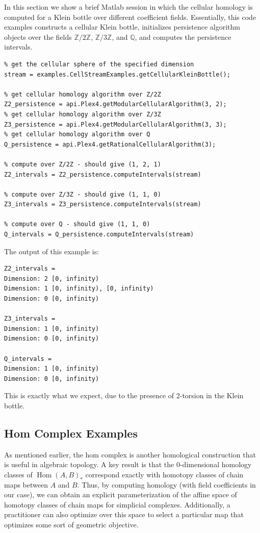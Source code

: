 \documentclass[runningheads,a4paper]{llncs}
\newcommand{\Hom}{\operatorname{Hom}}
\begin{document}
In this section we show a brief Matlab session in which the cellular homology is computed for a Klein bottle over different coefficient fields. Essentially, this code examples constructs a cellular Klein bottle, initializes persistence algorithm objects over the fields $\mathbb{Z}/2\mathbb{Z}$, $\mathbb{Z}/3\mathbb{Z}$, and $\mathbb{Q}$, and computes the persistence intervals.

\begin{verbatim}
% get the cellular sphere of the specified dimension
stream = examples.CellStreamExamples.getCellularKleinBottle();

% get cellular homology algorithm over Z/2Z
Z2_persistence = api.Plex4.getModularCellularAlgorithm(3, 2);
% get cellular homology algorithm over Z/3Z
Z3_persistence = api.Plex4.getModularCellularAlgorithm(3, 3);
% get cellular homology algorithm over Q
Q_persistence = api.Plex4.getRationalCellularAlgorithm(3);

% compute over Z/2Z - should give (1, 2, 1)
Z2_intervals = Z2_persistence.computeIntervals(stream)

% compute over Z/3Z - should give (1, 1, 0)
Z3_intervals = Z3_persistence.computeIntervals(stream)

% compute over Q - should give (1, 1, 0)
Q_intervals = Q_persistence.computeIntervals(stream)
\end{verbatim}
The output of this example is:
\begin{verbatim}
Z2_intervals =
Dimension: 2 [0, infinity)
Dimension: 1 [0, infinity), [0, infinity)
Dimension: 0 [0, infinity)
  
Z3_intervals =
Dimension: 1 [0, infinity)
Dimension: 0 [0, infinity)
 
Q_intervals =
Dimension: 1 [0, infinity)
Dimension: 0 [0, infinity)
\end{verbatim}
This is exactly what we expect, due to the presence of 2-torsion in the Klein bottle.

\subsection{Hom Complex Examples}

As mentioned earlier, the hom complex is another homological construction that is useful in algebraic topology. A key result is that the 0-dimensional homology classes of $\Hom(A,B)_*$ correspond exactly with homotopy classes of chain maps between $A$ and $B$. Thus, by computing homology (with field coefficients in our case), we can obtain an explicit parameterization of the affine space of homotopy classes of chain maps for simplicial complexes. Additionally, a practitioner can also optimize over this space to select a particular map that optimizes some sort of geometric objective.
\end{document}
